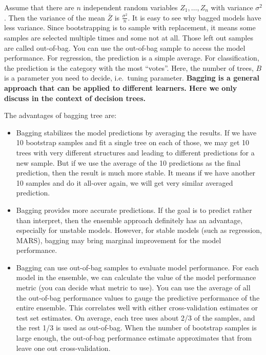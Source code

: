 \documentclass[
  12pt,
]{krantz}
\begin{document}
Assume that there are \(n\) independent random variables \(Z_1,\dots,Z_n\) with variance \(\sigma^2\). Then the variance of the mean \(\bar{Z}\) is \(\frac{\sigma^2}{n}\). It is easy to see why bagged models have less variance. Since bootstrapping is to sample with replacement, it means some samples are selected multiple times and some not at all. Those left out samples are called out-of-bag. You can use the out-of-bag sample to access the model performance. For regression, the prediction is a simple average. For classification, the prediction is the category with the most ``votes''. Here, the number of trees, \(B\) is a parameter you need to decide, i.e.~tuning parameter. \textbf{Bagging is a general approach that can be applied to different learners. Here we only discuss in the context of decision trees.}

The advantages of bagging tree are:

\begin{itemize}
\item
  Bagging stabilizes the model predictions by averaging the results. If we have 10 bootstrap samples and fit a single tree on each of those, we may get 10 trees with very different structures and leading to different predictions for a new sample. But if we use the average of the 10 predictions as the final prediction, then the result is much more stable. It means if we have another 10 samples and do it all-over again, we will get very similar averaged prediction.
\item
  Bagging provides more accurate predictions. If the goal is to predict rather than interpret, then the ensemble approach definitely has an advantage, especially for unstable models. However, for stable models (such as regression, MARS), bagging may bring marginal improvement for the model performance.
\item
  Bagging can use out-of-bag samples to evaluate model performance. For each model in the ensemble, we can calculate the value of the model performance metric (you can decide what metric to use). You can use the average of all the out-of-bag performance values to gauge the predictive performance of the entire ensemble. This correlates well with either cross-validation estimates or test set estimates. On average, each tree uses about 2/3 of the samples, and the rest 1/3 is used as out-of-bag. When the number of bootstrap samples is large enough, the out-of-bag performance estimate approximates that from leave one out cross-validation.
\end{itemize}
\end{document}
